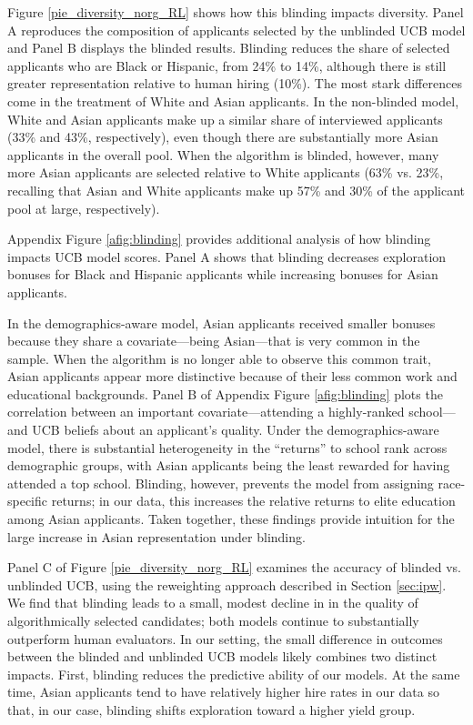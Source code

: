 \documentclass[crop,noquery,editorname,historyrev,nosurname,runningno,sepcount]{RESTUD}
\begin{document}
Figure \ref{pie_diversity_norg_RL} shows how this blinding impacts diversity.  Panel A reproduces the composition of applicants selected by the unblinded UCB model and Panel B displays the blinded results.  Blinding reduces the share of selected applicants who are Black or Hispanic, from 24\% to 14\%, although there is still greater representation relative to human hiring (10\%).  The most stark differences come in the treatment of White and Asian applicants.  In the non-blinded model, White and Asian applicants make up a similar share of interviewed applicants (33\% and 43\%, respectively), even though there are substantially more Asian applicants in the overall pool.  When the algorithm is blinded, however, many more Asian applicants are selected relative to White applicants (63\% vs. 23\%, recalling that Asian and White applicants make up 57\% and 30\% of the applicant pool at large, respectively).  

Appendix Figure \ref{afig:blinding} provides additional analysis of how blinding impacts UCB model scores.  Panel A shows that blinding decreases exploration bonuses for Black and Hispanic applicants while increasing bonuses for Asian applicants.  

In the demographics-aware model, Asian applicants received smaller bonuses because they share a covariate---being Asian---that is very common in the sample.  When the algorithm is no longer able to observe this common trait, Asian applicants appear more distinctive because of their less common work and educational backgrounds. Panel B of Appendix Figure \ref{afig:blinding} plots the correlation between an important covariate---attending a highly-ranked school---and UCB beliefs about an applicant's quality.  Under the demographics-aware model, there is substantial heterogeneity in the ``returns'' to school rank across demographic groups, with Asian applicants being the least rewarded for having attended a top school.  Blinding, however, prevents the model from assigning race-specific returns; in our data, this increases the relative returns to elite education among Asian applicants.  Taken together, these findings provide intuition for the large increase in Asian representation under blinding.

Panel C of Figure \ref{pie_diversity_norg_RL} examines the accuracy of blinded vs. unblinded UCB, using the reweighting approach described in Section \ref{sec:ipw}.  We find that blinding leads to a small, modest decline in in the quality of algorithmically selected candidates; both models continue to substantially outperform human evaluators.  In our setting, the small difference in outcomes between the blinded and unblinded UCB models likely combines two distinct impacts.  First, blinding reduces the predictive ability of our models.  At the same time, Asian applicants tend to have relatively higher hire rates in our data so that, in our case, blinding shifts exploration toward a higher yield group.
\end{document}
